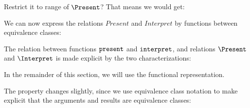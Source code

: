 Restrict it to range of $\Present$?
That means we would get:


\textuparrow\textuparrow\textuparrow\textuparrow
\ec

We can now express the relations $Present$ and $Interpret$ by functions between equivalence classes:



%

The relation between functions ${\tt present}$ and ${\tt interpret}$, and relations $\Present$ and $\Interpret$ is made explicit by the two characterizations: 


In the remainder of this section, we will use the functional representation.




%
%



The  property changes slightly, since we use equivalence class notation to make explicit that the arguments and results are equivalence classes:


